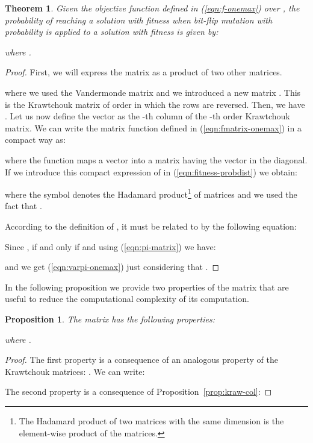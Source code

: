 \documentclass{article}
\newtheorem{theorem}{Theorem}
\newtheorem{proposition}{Proposition}
\begin{document}
\begin{theorem}
Given the objective function defined in (\ref{eqn:f-onemax}) over , the probability of reaching a solution with fitness  when bit-flip mutation with probability  is applied to a solution with fitness  is given by:

where .
\end{theorem}
\begin{proof}
First, we will express the matrix  as a product of two other matrices.

where we used the Vandermonde matrix and we introduced a new matrix . This is the Krawtchouk matrix of order  in which the rows are reversed. Then, we have . Let us now define the vector  as the -th column of the -th order Krawtchouk matrix. We can write the matrix function  defined in (\ref{eqn:fmatrix-onemax}) in a compact way as:

where the function  maps a vector into a matrix having the vector in the diagonal.
If we introduce this compact expression of  in (\ref{eqn:fitness-probdist}) we obtain:

where the symbol  denotes the Hadamard product\footnote{The Hadamard product of two matrices with the same dimension is the element-wise product of the matrices.} of matrices and we used the fact that . 

According to the definition of , it must be related to  by the following equation:


Since ,  if and only if  and using (\ref{eqn:pi-matrix}) we have:

and we get (\ref{eqn:varpi-onemax}) just considering that .
\end{proof}

In the following proposition we provide two properties of the  matrix that are useful to reduce the computational complexity of its computation.

\begin{proposition}
\label{prop:varpi}
The matrix  has the following properties:

where .
\end{proposition}
\begin{proof}
The first property is a consequence of an analogous property of the Krawtchouk matrices:  \cite[p. 179]{Terras1999}. We can write:


The second property is a consequence of Proposition~\ref{prop:kraw-col}:

\end{proof}
\end{document}
